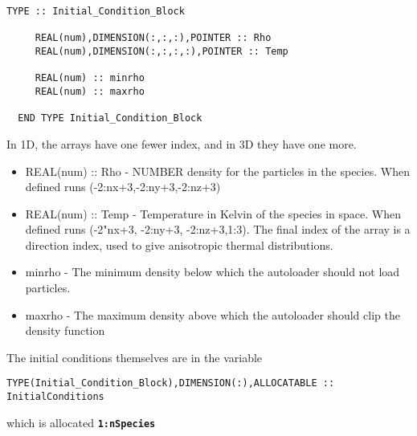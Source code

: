 \documentclass[12pt]{article}
\newcommand{\simpleboxverbatim}{\begin{Verbatim}[obeytabs=true,frame=single,
  framerule=0.5mm,rulecolor=\color{warwickmid}]}
\newcommand{\inlinecode}[1]{{\color{warwickred} \bf\texttt{#1}}}
\begin{document}
\simpleboxverbatim
  TYPE :: Initial_Condition_Block

     REAL(num),DIMENSION(:,:,:),POINTER :: Rho
     REAL(num),DIMENSION(:,:,:,:),POINTER :: Temp

     REAL(num) :: minrho
     REAL(num) :: maxrho

  END TYPE Initial_Condition_Block
\end{Verbatim}

In 1D, the arrays have one fewer index, and in 3D they have one more.
\begin{itemize}
\item REAL(num) :: Rho - NUMBER density for the particles in the species. When
  defined runs (-2:nx+3,-2:ny+3,-2:nz+3)
\item REAL(num) :: Temp - Temperature in Kelvin of the species in space. When
  defined runs (-2"nx+3, -2:ny+3, -2:nz+3,1:3). The final index of the array
  is a direction index, used to give anisotropic thermal distributions.
\item minrho - The minimum density below which the autoloader should not load
  particles.
\item maxrho - The maximum density above which the autoloader should clip the
  density function
\end{itemize}

The initial conditions themselves are in the variable
\simpleboxverbatim
  TYPE(Initial_Condition_Block),DIMENSION(:),ALLOCATABLE :: InitialConditions
\end{Verbatim}
which is allocated \inlinecode{1:nSpecies}
\pagebreak
\end{document}
